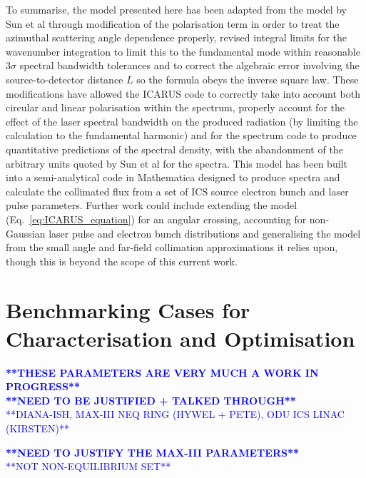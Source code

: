 \documentclass[../main.tex]{subfiles}
\begin{document}
To summarise, the model presented here has been adapted from the model by Sun et al \cite{sun2009characterizations,sun2011theoretical} through modification of the polarisation term in order to treat the azimuthal scattering angle dependence properly, revised integral limits for the wavenumber integration to limit this to the fundamental mode within reasonable $3\sigma$ spectral bandwidth tolerances and to correct the algebraic error involving the source-to-detector distance $L$ so the formula obeys the inverse square law. These modifications have allowed the \textsc{ICARUS} code to correctly take into account both circular and linear polarisation within the spectrum, properly account for the effect of the laser spectral bandwidth on the produced radiation (by limiting the calculation to the fundamental harmonic) and for the spectrum code to produce quantitative predictions of the spectral density, with the abandonment of the arbitrary units quoted by Sun et al \cite{sun2009characterizations,sun2011theoretical} for the spectra. This model has been built into a semi-analytical code in Mathematica designed to produce spectra and calculate the collimated flux from a set of ICS source electron bunch and laser pulse parameters. Further work could include extending the model (Eq.~\ref{eq:ICARUS_equation}) for an angular crossing, accounting for non-Gaussian laser pulse and electron bunch distributions and generalising the model from the small angle and far-field collimation approximations it relies upon, though this is beyond the scope of this current work.        

\section{Benchmarking Cases for Characterisation and Optimisation}
\label{sec:benchmarking_cases_characterisation_optimisation}

\textcolor{blue}{\textbf{**THESE PARAMETERS ARE VERY MUCH A WORK IN PROGRESS** \\ **NEED TO BE JUSTIFIED + TALKED THROUGH**} \\ **DIANA-ISH, MAX-III NEQ RING (HYWEL + PETE), ODU ICS LINAC (KIRSTEN)** \\  }

\textcolor{blue}{\textbf{**NEED TO JUSTIFY THE MAX-III PARAMETERS**}\\**NOT NON-EQUILIBRIUM SET**}
\end{document}
